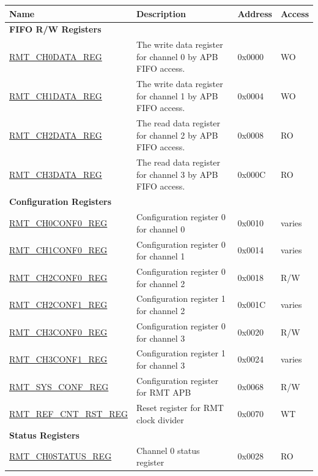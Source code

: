 \begin{longtable}{ | p{5.3cm} | p{7.2cm} | p{1.3cm} | p{1.7cm} | }
\hline\rowcolor{lightgray}
Name & Description &  Address & Access \\ \hline
\endhead
\multicolumn{4}{|l|}{\textbf{FIFO R/W Registers}} \\ \hline
\hyperref[regdesc:RMTCHNDATAREG]{RMT\_CH0DATA\_REG} & The write data register for channel 0 by APB FIFO access. & 0x0000 & WO \\ \hline
\hyperref[regdesc:RMTCHNDATAREG]{RMT\_CH1DATA\_REG} & The write data register for channel 1 by APB FIFO access. & 0x0004 & WO \\ \hline
\hyperref[regdesc:RMTCHMDATAREG]{RMT\_CH2DATA\_REG} & The read data register for channel 2 by APB FIFO access. & 0x0008 & RO \\ \hline
\hyperref[regdesc:RMTCHMDATAREG]{RMT\_CH3DATA\_REG} & The read data register for channel 3 by APB FIFO access. & 0x000C & RO \\ \hline
\multicolumn{4}{|l|}{\textbf{Configuration Registers}} \\ \hline
\hyperref[regdesc:RMTCHNCONF0REG]{RMT\_CH0CONF0\_REG} & Configuration register 0 for channel 0& 0x0010 & varies \\ \hline
\hyperref[regdesc:RMTCHNCONF0REG]{RMT\_CH1CONF0\_REG} & Configuration register 0 for channel 1& 0x0014 & varies \\ \hline
\hyperref[regdesc:RMTCHMCONF0REG]{RMT\_CH2CONF0\_REG} & Configuration register 0 for channel 2& 0x0018 & R/W \\ \hline
\hyperref[regdesc:RMTCHMCONF1REG]{RMT\_CH2CONF1\_REG} & Configuration register 1 for channel 2& 0x001C & varies \\ \hline
\hyperref[regdesc:RMTCHMCONF0REG]{RMT\_CH3CONF0\_REG} & Configuration register 0 for channel 3& 0x0020 & R/W \\ \hline
\hyperref[regdesc:RMTCHMCONF1REG]{RMT\_CH3CONF1\_REG} & Configuration register 1 for channel 3& 0x0024 & varies \\ \hline
\hyperref[regdesc:RMTSYSCONFREG]{RMT\_SYS\_CONF\_REG} & Configuration register for RMT APB  & 0x0068 & R/W \\ \hline
\hyperref[regdesc:RMTREFCNTRSTREG]{RMT\_REF\_CNT\_RST\_REG} & Reset register for RMT clock divider  & 0x0070 & WT \\ \hline
\multicolumn{4}{|l|}{\textbf{Status Registers}} \\ \hline
\hyperref[regdesc:RMTCHNSTATUSREG]{RMT\_CH0STATUS\_REG} & Channel 0 status register & 0x0028 & RO \\ \hline

\end{longtable}
